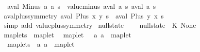 \begin{isabellebody}
\ \ {\isachardoublequoteopen}aval\ {\isacharparenleft}Minus\ a\ a\ s\ {\isacharequal}\ value{\isacharunderscore}minus\ {\isacharparenleft}aval\ a\ s{\isacharparenright}\ {\isacharparenleft}aval\ a\ s{\isacharparenright}{\isachardoublequoteclose}\isanewline
\isanewline
{}\isamarkupfalse%
\ aval{\isacharunderscore}plus{\isacharunderscore}symmetry{\isacharcolon}\ {\isachardoublequoteopen}aval\ {\isacharparenleft}Plus\ x\ y{\isacharparenright}\ s\ {\isacharequal}\ aval\ {\isacharparenleft}Plus\ y\ x{\isacharparenright}\ s{\isachardoublequoteclose}\isanewline
%
\isadelimproof
\ \ %
\endisadelimproof
%
\isatagproof
{}\isamarkupfalse%
\ {\isacharparenleft}simp\ add{\isacharcolon}\ value{\isacharunderscore}plus{\isacharunderscore}symmetry{\isacharparenright}%
\endisatagproof
{\isafoldproof}%
%
\isadelimproof
\isanewline
%
\endisadelimproof
\isanewline
{}\isamarkupfalse%
\ null{\isacharunderscore}state\ {\isacharparenleft}{\isachardoublequoteopen}{\isacharless}{\isachargreater}{\isachardoublequoteclose}{\isacharparenright}\ \isanewline
\ \ {\isachardoublequoteopen}null{\isacharunderscore}state\ {\isasymequiv}\ {\isacharparenleft}K{\isachardollar}\ None{\isacharparenright}{\isachardoublequoteclose}\isanewline
\isanewline
{}\isamarkupfalse%
\ maplets\ \ maplet\isanewline
\isanewline
\isanewline
{}\isamarkupfalse%
\isanewline
\ \ {\isachardoublequoteopen}{\isacharunderscore}maplet{\isachardoublequoteclose}\ \ {\isacharcolon}{\isacharcolon}\ {\isachardoublequoteopen}{\isacharbrackleft}{\isacharprime}a{\isacharcomma}\ {\isacharprime}a{\isacharbrackright}\ {\isasymRightarrow}\ maplet{\isachardoublequoteclose}\ \ \ \ \ \ \ \ \ \ \ \ \ {\isacharparenleft}{\isachardoublequoteopen}{\isacharunderscore}\ {\isacharslash}{\isacharcolon}{\isacharequal}{\isacharslash}\ {\isacharunderscore}{\isachardoublequoteclose}{\isacharparenright}\isanewline
\ \ {\isachardoublequoteopen}{\isacharunderscore}maplets{\isachardoublequoteclose}\ {\isacharcolon}{\isacharcolon}\ {\isachardoublequoteopen}{\isacharbrackleft}{\isacharprime}a{\isacharcomma}\ {\isacharprime}a{\isacharbrackright}\ {\isasymRightarrow}\ maplet{\isachardoublequoteclose}\ \ \ \ \ \ \ \ \ \ \ \ \ {\isacharparenleft}{\isachardoublequoteopen}{\isacharunderscore}\ {\isacharslash}{\isacharbrackleft}{\isacharcolon}{\isacharequal}{\isacharbrackright}{\isacharslash}\ {\isacharunderscore}{\isachardoublequoteclose}{\isacharparenright}\isanewline

\end{isabellebody}
